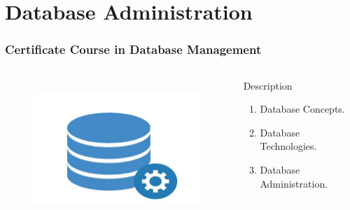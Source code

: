 \section{Database Administration}
\begin{frame}
	\frametitle{Certificate Course in Database Management }
		\begin{columns}
		
		
		\begin{figure}
			\includegraphics[width=200pt,height=150pt]{figures/course_dbm.jpg}
		\end{figure}
		
		
		\begin{block}{Description}
			
			\begin{enumerate}
				\item  Database Concepts. 
				\item  Database Technologies.
				\item  Database Administration.
			\end{enumerate}
			
		\end{block}
		
	\end{columns}
\end{frame}